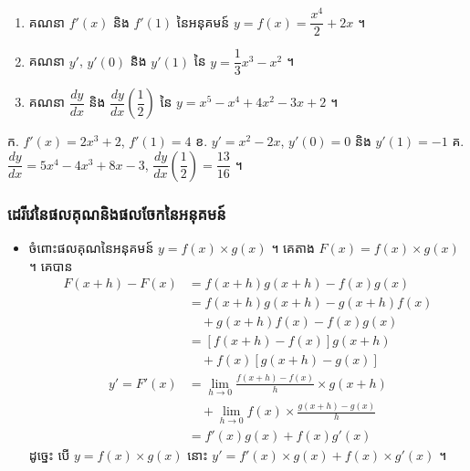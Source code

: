 \begin{pro}
\begin{enumerate}[a]
  \item គណនា $f'(x)$ និង $f'(1)$ នៃអនុគមន៍ $y = f(x) = \dfrac{x^4}{2} + 2x$ ។
  \item គណនា $y'$, $y'(0)$ និង $y'(1)$ នៃ $y = \dfrac{1}{3}x^3 - x^2$ ។
  \item គណនា $\dfrac{dy}{dx}$ និង $\dfrac{dy}{dx}\left(\dfrac{1}{2}\right)$ នៃ $y = x^5 - x^4 + 4x^2 - 3x + 2$ ។
\end{enumerate}
\ans
ក. $f'(x) = 2x^3 + 2$, $f'(1) = 4$ \quad ខ. $y' = x^2 - 2x$, $y'(0) = 0$ និង $y'(1) = -1$ \quad គ. $\dfrac{dy}{dx} = 5x^4 - 4x^3 + 8x - 3$, $\dfrac{dy}{dx}\left(\dfrac{1}{2}\right) = \dfrac{13}{16}$ ។
\end{pro}

\subsubsection{ដេរីវេនៃផលគុណនិងផលចែកនៃអនុគមន៍}

\begin{itemize}
  \item ចំពោះផលគុណនៃអនុគមន៍ $y = f(x)\times g(x)$ ។ គេតាង $F(x) = f(x)\times g(x)$ ។ គេបាន
  \[ \begin{aligned}
F(x + h) - F(x) &= f(x + h)g(x + h) - f(x)g(x)\\
&= f(x + h)g(x + h) - g(x + h)f(x)\\
&\quad + g(x + h)f(x) - f(x)g(x)\\
&= [f(x + h) - f(x)]g(x + h)\\
&\quad + f(x)[g(x + h) - g(x)]
\end{aligned} \]
  \[ \begin{aligned} y' = F'(x) &= \lim_{h \to 0}\frac{f(x + h) - f(x)}{h}\times g(x + h)\\ &\quad + \lim_{h \to 0} f(x)\times\frac{g(x + h) - g(x)}{h}\\ &= f'(x)g(x) + f(x)g'(x) \end{aligned} \]
  ដូច្នេះ បើ $y = f(x)\times g(x)$ នោះ $y' = f'(x)\times g(x) + f(x)\times g'(x)$ ។
\end{itemize}

